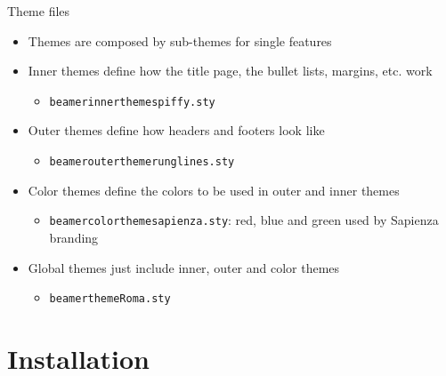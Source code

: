 \begin{frame}[t,fragile]{Theme files}
\begin{itemize}
\item Themes are composed by sub-themes for single features
\item Inner themes define how the title page, the bullet lists, margins,
    etc. work
  \begin{itemize}
  \item \verb!beamerinnerthemespiffy.sty!
  \end{itemize}
\item Outer themes define how headers and footers look like
  \begin{itemize}
  \item \verb!beamerouterthemerunglines.sty!
  \end{itemize}
\item Color themes define the colors to be used in outer and inner themes
  \begin{itemize}
  \item \verb!beamercolorthemesapienza.sty!: red, blue and green used by Sapienza branding
  \end{itemize}
\item Global themes just include inner, outer and color themes
  \begin{itemize}
  \item \verb!beamerthemeRoma.sty!
  \end{itemize}
\end{itemize}
\end{frame}

\section{Installation}
